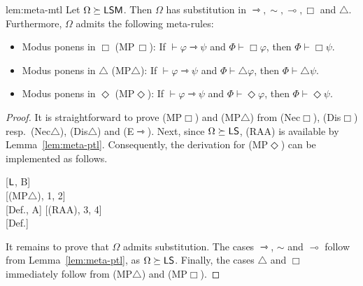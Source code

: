 \documentclass[a4paper,english,fleqn,11pt,final]{scrartcl}
\newcommand{\negg}{{\sim}}
\newcommand{\sfS}{\protect\ensuremath{\mathsf{S}}}
\newcommand{\sfL}{\protect\ensuremath{\mathsf{L}}}
\newcommand{\sfM}{\protect\ensuremath{\mathsf{M}}}
\newcommand{\limp}{\multimap}
\newcommand{\timp}{\rightarrowtriangle}
\newcommand{\Deriv}[1]{{\normalfont\textsf{#1}}}
\theoremstyle{plain}
\theoremstyle{definition}
\newcommand{\thm}{\text{\scriptsize\; (thm)}}
\begin{document}
\begin{replemma}{lem:meta-mtl}
Let $\Omega\succeq \sfL\sfS\sfM$.
Then $\Omega$ has substitution in $\timp, \negg, \limp, \Box$ and $\triangle$.
Furthermore, $\Omega$ admits the following meta-rules:
\begin{itemize}
	\item Modus ponens in $\Box$ \Deriv{(MP\,$\Box$)}:
	If $\vdash \varphi \timp \psi$ and $\Phi \vdash \Box \varphi$, then $\Phi \vdash \Box \psi$.
	\item Modus ponens in $\triangle$ \Deriv{(MP$\triangle$)}:
	If $\vdash \varphi \timp \psi$ and $\Phi \vdash \triangle \varphi$, then $\Phi \vdash \triangle \psi$.
	\item Modus ponens in $\Diamond$ \Deriv{(MP$\Diamond$)}:
	If $\vdash \varphi \timp \psi$ and $\Phi \vdash \Diamond \varphi$, then $\Phi \vdash \Diamond \psi$.
\end{itemize}
\end{replemma}
\begin{proof}
It is straightforward to prove \Deriv{(MP$\Box$)} and \Deriv{(MP$\triangle$)} from \Deriv{(Nec$\Box$)}, \Deriv{(Dis$\Box$)} resp.\ \Deriv{(Nec$\triangle$)}, \Deriv{(Dis$\triangle$)} and \Deriv{(E$\timp$)}.
Next, since $\Omega \succeq \sfL\sfS$, \Deriv{(RAA)} is available by Lemma~\ref{lem:meta-ptl}.
Consequently, the derivation for \Deriv{(MP$\Diamond$)} can be implemented as follows.

\smallskip

{
\setlength{\fitchprfwidth}{1.5in}

\fitchprf{
\pline[A ]{\Diamond \varphi}\\
\pline[B ]{\varphi \timp \psi \thm}
}
{
\pline[1 ]{\negg \psi \timp \negg \varphi \thm}[$\sfL$, B]\\
\subproof{\pline[2 ]{\triangle \negg \psi}}
{
\pline[3 ]{\triangle \negg \varphi}[\Deriv{(MP$\triangle$)}, 1, 2]\\
\pline[4 ]{\negg \triangle \negg \varphi}[Def., A]
}
\pline[5 ]{\negg\triangle\negg\psi}[\Deriv{(RAA)}, 3, 4]\\
\pline[\slider]{\Diamond\psi }[Def.]
}
}

\medskip

It remains to prove that $\Omega$ admits substitution.
The cases $\timp$, $\negg$ and $\limp$ follow from Lemma~\ref{lem:meta-ptl}, as $\Omega \succeq \sfL\sfS$.
Finally, the cases $\triangle$ and $\Box$ immediately follow from \Deriv{(MP$\triangle$)} and \Deriv{(MP$\Box$)}.
\end{proof}
 
\end{document}
